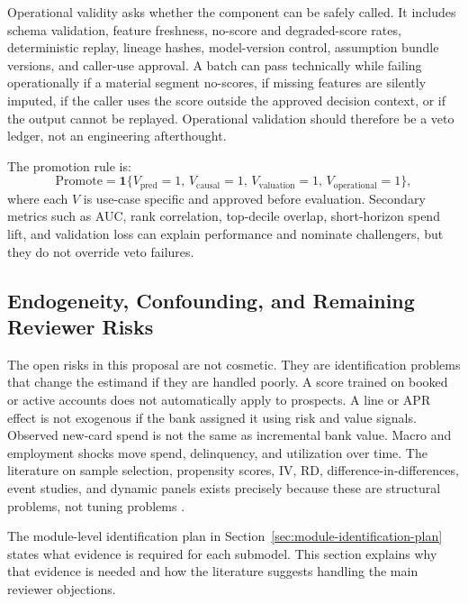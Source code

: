 \documentclass[11pt]{article}
\newcommand{\1}{\mathbf{1}}
\begin{document}
Operational validity asks whether the component can be safely called. It
includes schema validation, feature freshness, no-score and degraded-score
rates, deterministic replay, lineage hashes, model-version control, assumption
bundle versions, and caller-use approval. A batch can pass technically while
failing operationally if a material segment no-scores, if missing features are
silently imputed, if the caller uses the score outside the approved decision
context, or if the output cannot be replayed. Operational validation should
therefore be a veto ledger, not an engineering afterthought.

The promotion rule is:
\[
  \mathrm{Promote}
  =
  \1\{
    V_{\mathrm{pred}}=1,\,
    V_{\mathrm{causal}}=1,\,
    V_{\mathrm{valuation}}=1,\,
    V_{\mathrm{operational}}=1
  \},
\]
where each $V$ is use-case specific and approved before evaluation. Secondary
metrics such as AUC, rank correlation, top-decile overlap, short-horizon spend
lift, and validation loss can explain performance and nominate challengers,
but they do not override veto failures.

\subsection{Endogeneity, Confounding, and Remaining Reviewer Risks}
\label{sec:reviewer-risks}

The open risks in this proposal are not cosmetic. They are identification
problems that change the estimand if they are handled poorly. A score trained
on booked or active accounts does not automatically apply to prospects. A line
or APR effect is not exogenous if the bank assigned it using risk and value
signals. Observed new-card spend is not the same as incremental bank value.
Macro and employment shocks move spend, delinquency, and utilization over
time. The literature on sample selection, propensity scores, IV, RD,
difference-in-differences, event studies, and dynamic panels exists precisely
because these are structural problems, not tuning problems
\citep{heckman1979selection,rosenbaum1983propensity,angristimbensrubin1996iv,
lee2010rd,callaway2021did,sun2021eventstudy,arellano1991panel,
blundell1998initial,hernanrobins2020causal}.

The module-level identification plan in
Section~\ref{sec:module-identification-plan} states what evidence is required
for each submodel. This section explains why that evidence is needed and how
the literature suggests handling the main reviewer objections.
\end{document}
